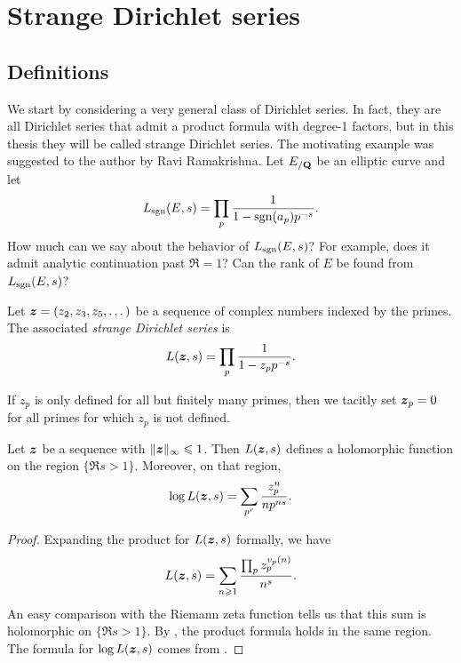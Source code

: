 
\chapter{Strange Dirichlet series}





\section{Definitions}

We start by considering a very general class of Dirichlet series. In fact, they 
are all Dirichlet series that admit a product formula with degree-1 factors, 
but in this thesis they will be called strange Dirichlet series. The motivating 
example was suggested to the author by Ravi Ramakrishna. Let $E_{/\mathbf{Q}}$ be an 
elliptic curve and let 
\[
	L_{\operatorname{sgn}}(E,s) = \prod_p \frac{1}{1-\operatorname{sgn}(a_p) p^{-s}} .
\]
How much can we say about the behavior of $L_{\operatorname{sgn}}(E,s)$? For example, does it 
admit analytic continuation past $\Re = 1$? Can the rank of $E$ be found from 
$L_{\operatorname{sgn}}(E,s)$?

\begin{definition}
Let ${\boldsymbol z}=(z_2,z_3,z_5,\dots)$ be a sequence of complex numbers indexed by the 
primes. The associated \emph{strange Dirichlet series} is 
\[
	L({\boldsymbol z},s) = \prod_p \frac{1}{1- z_p p^{-s}} .
\]
\end{definition}

If $z_p$ is only defined for all but finitely many primes, then we tacitly set 
${\boldsymbol z}_p = 0$ for all primes for which $z_p$ is not defined. 

\begin{lemma}
Let ${\boldsymbol z}$ be a sequence with $\|{\boldsymbol z}\|_\infty \leqslant 1$. Then $L({\boldsymbol z},s)$ 
defines a holomorphic function on the region $\{\Re s>1\}$. Moreover, on that 
region, 
\[
	\log L({\boldsymbol z},s) = \sum_{p^r} \frac{z_p^n}{n p^{n s}} .
\]
\end{lemma}
\begin{proof}
Expanding the product for $L({\boldsymbol z},s)$ formally, we have 
\[
	L({\boldsymbol z},s) = \sum_{n\geqslant 1} \frac{\prod_p z_p^{v_p(n)}}{n^s} .
\]
An easy comparison with the Riemann zeta function tells us that this sum 
is holomorphic on $\{\Re s>1\}$. By \cite[Th.~11.7]{apostol-1976}, the 
product formula holds in the same region. The formula for $\log L({\boldsymbol z},s)$ 
comes from \cite[11.9 Ex.2]{apostol-1976}. 
\end{proof}

